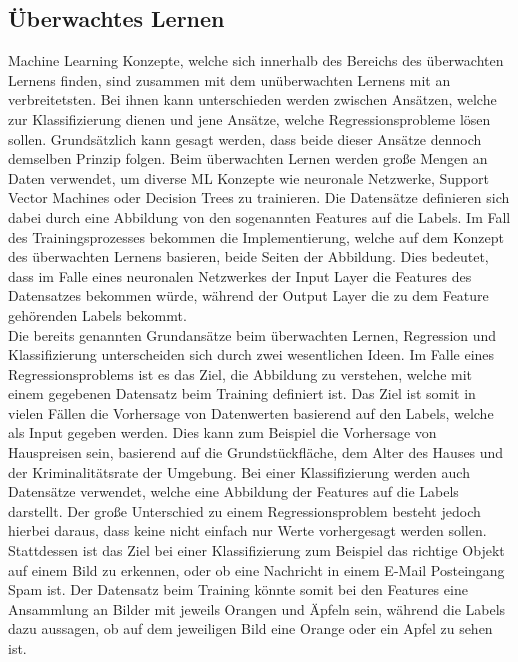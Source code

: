 \documentclass[]{iat}
\begin{document}
\subsection{Überwachtes Lernen} \label{sec:ueberwachtes_lernen}
Machine Learning Konzepte, welche sich innerhalb des Bereichs des überwachten Lernens finden, sind zusammen mit dem unüberwachten Lernens mit an verbreitetsten. Bei ihnen kann unterschieden werden zwischen Ansätzen, welche zur Klassifizierung dienen und jene Ansätze, welche Regressionsprobleme lösen sollen. Grundsätzlich kann gesagt werden, dass beide dieser Ansätze dennoch demselben Prinzip folgen. Beim überwachten Lernen werden große Mengen an Daten verwendet, um diverse ML Konzepte wie neuronale Netzwerke, Support Vector Machines oder Decision Trees zu trainieren. Die Datensätze definieren sich dabei durch eine Abbildung von den sogenannten Features auf die Labels. Im Fall des Trainingsprozesses bekommen die Implementierung, welche auf dem Konzept des überwachten Lernens basieren, beide Seiten der Abbildung. Dies bedeutet, dass im Falle eines neuronalen Netzwerkes der Input Layer die Features des Datensatzes bekommen würde, während der Output Layer die zu dem Feature gehörenden Labels bekommt.\\
Die bereits genannten Grundansätze beim überwachten Lernen, Regression und Klassifizierung unterscheiden sich durch zwei wesentlichen Ideen. Im Falle eines Regressionsproblems ist es das Ziel, die Abbildung zu verstehen, welche mit einem gegebenen Datensatz beim Training definiert ist. Das Ziel ist somit in vielen Fällen die Vorhersage von Datenwerten basierend auf den Labels, welche als Input gegeben werden. Dies kann zum Beispiel die Vorhersage von Hauspreisen sein, basierend auf die Grundstückfläche, dem Alter des Hauses und der Kriminalitätsrate der Umgebung. Bei einer Klassifizierung werden auch Datensätze verwendet, welche eine Abbildung der Features auf die Labels darstellt. Der große Unterschied zu einem Regressionsproblem besteht jedoch hierbei daraus, dass keine nicht einfach nur Werte vorhergesagt werden sollen. Stattdessen ist das Ziel bei einer Klassifizierung zum Beispiel das richtige Objekt auf einem Bild zu erkennen, oder ob eine Nachricht in einem E-Mail Posteingang Spam ist. Der Datensatz beim Training könnte somit bei den Features eine Ansammlung an Bilder mit jeweils Orangen und Äpfeln sein, während die Labels dazu aussagen, ob auf dem jeweiligen Bild eine Orange oder ein Apfel zu sehen ist. \cite[]{murphy2012machine} \cite[]{FrocMasc2021}
\end{document}
